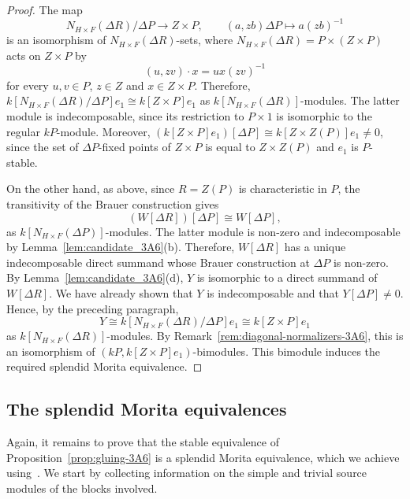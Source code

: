 \begin{proof}
The map
\[
N_{H\times F}(\Delta R)/\Delta P\longrightarrow Z\times P,\qquad (a,zb)\Delta P\mapsto a(zb)^{-1}
\]
is an isomorphism of $N_{H\times F}(\Delta R)$-sets, where $N_{H\times F}(\Delta R)=P\times(Z\times P)$ acts on
$Z\times P$ by
\[
(u,zv)\cdot x=ux(zv)^{-1}
\]
for every $u,v\in P$, $z\in Z$ and $x\in Z\times P$. Therefore, $k[N_{H\times F}(\Delta R)/\Delta P]e_1\cong k[Z\times P]e_1$ as $k[N_{H\times F}(\Delta R)]$-modules. The latter module is indecomposable, since its restriction to $P\times 1$ is isomorphic to the regular $kP$-module. Moreover, $(k[Z\times P]e_1)[\Delta P]\cong k[Z\times Z(P)]e_1\neq 0$, since the set of $\Delta P$-fixed points of $Z\times P$ is equal to $Z\times Z(P)$ and $e_1$ is $P$-stable. 

On the other hand, as above, since $R=Z(P)$ is characteristic in $P$, the transitivity of the Brauer construction \cite[Proposition~5.8.5]{LinckelmannVol1} gives
\[
(W[\Delta R])[\Delta P]\cong W[\Delta P],
\]
as $k[N_{H\times F}(\Delta P)]$-modules. The latter module is non-zero and indecomposable by Lemma~\ref{lem:candidate_3A6}(b). Therefore, $W[\Delta R]$ has a unique indecomposable direct summand whose Brauer construction at $\Delta P$ is non-zero. By Lemma~\ref{lem:candidate_3A6}(d), $Y$ is isomorphic to a direct
summand of $W[\Delta R]$. We have already shown that $Y$ is indecomposable and that $Y[\Delta P]\neq 0$. Hence, by the preceding paragraph,
\[
Y\cong k[N_{H\times F}(\Delta R)/\Delta P]e_1 \cong k[Z\times P]e_1
\]
as $k[N_{H\times F}(\Delta R)]$-modules. By Remark~\ref{rem:diagonal-normalizers-3A6}, this is an isomorphism of $(kP,k[Z\times P]e_1)$-bimodules. This bimodule induces the required splendid Morita equivalence.
\end{proof}





\vspace{2mm}
\subsection{The splendid Morita equivalences}
Again, it remains to prove that the stable equivalence of Proposition~\ref{prop:gluing-3A6} is a splendid Morita equivalence, which we achieve using~\cite[Theorem 2.1(ii) and~(iii)]{Lin96StableEqs}. We start by collecting information on the simple and trivial source modules of the blocks involved.

